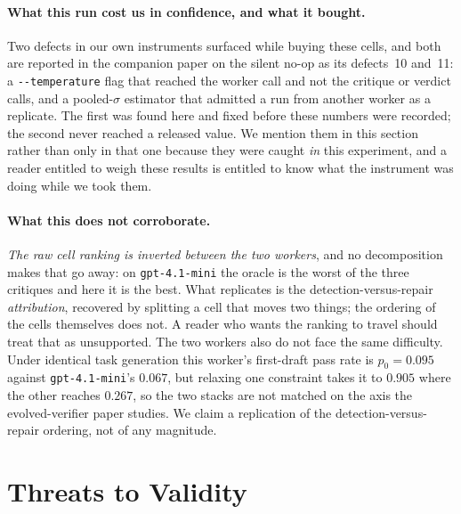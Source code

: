 \documentclass[11pt]{article}
\begin{document}
\paragraph{What this run cost us in confidence, and what it bought.} Two defects in our own
instruments surfaced while buying these cells, and both are reported in the companion paper on
the silent no-op as its defects~10 and~11: a \texttt{-{}-temperature} flag that reached the
worker call and not the critique or verdict calls, and a pooled-$\sigma$ estimator that admitted
a run from another worker as a replicate. The first was found here and fixed before these numbers
were recorded; the second never reached a released value. We mention them in this section rather
than only in that one because they were caught \emph{in} this experiment, and a reader entitled
to weigh these results is entitled to know what the instrument was doing while we took them.

\paragraph{What this does not corroborate.} \emph{The raw cell ranking is inverted between the
two workers}, and no decomposition makes that go away: on \texttt{gpt-4.1-mini} the oracle is the
worst of the three critiques and here it is the best. What replicates is the
detection-versus-repair \emph{attribution}, recovered by splitting a cell that moves two things;
the ordering of the cells themselves does not. A reader who wants the ranking to travel should
treat that as unsupported. The two workers also do not face the same difficulty. Under
identical task generation this worker's first-draft pass rate is $p_0 = 0.095$ against
\texttt{gpt-4.1-mini}'s $0.067$, but relaxing one constraint takes it to $0.905$ where the other
reaches $0.267$, so the two stacks are not matched on the axis the evolved-verifier paper studies. We claim a replication of the detection-versus-repair ordering, not of any magnitude.

\section{Threats to Validity}
\label{sec:threats}
\end{document}
